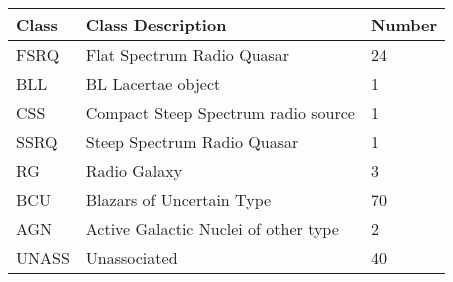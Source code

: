 \begin{tabular}{lll} 
\hline
\hline
  \multicolumn{1}{l}{Class}&
  \multicolumn{1}{l}{Class Description}&
  \multicolumn{1}{l}{Number}\\
\hline
FSRQ & Flat Spectrum Radio Quasar & 24\\
BLL & BL Lacertae object &  1\\
CSS & Compact Steep Spectrum radio source & 1\\
SSRQ & Steep Spectrum Radio Quasar & 1\\
RG & Radio Galaxy & 3\\
BCU & Blazars of Uncertain Type & 70\\
AGN & Active Galactic Nuclei of other type & 2\\
UNASS & Unassociated & 40\\
\hline
\end{tabular}
